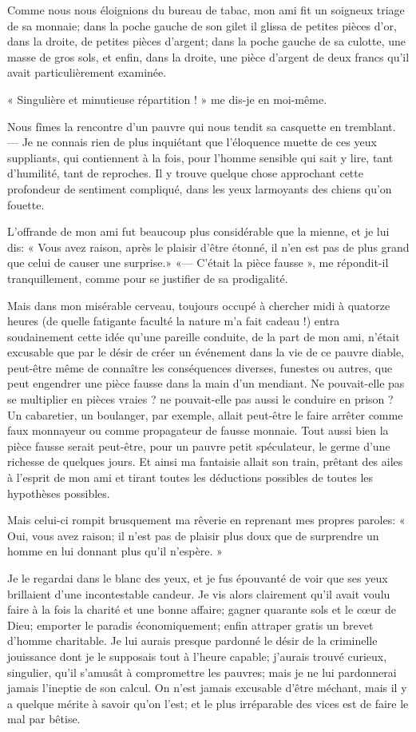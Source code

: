 Comme nous nous éloignions du bureau de tabac, mon ami fit un soigneux
triage de sa monnaie; dans la poche gauche de son gilet il glissa de
petites pièces d’or, dans la droite, de petites pièces
d’argent; dans la poche gauche de sa culotte, une
masse de gros sols, et enfin, dans la droite, une pièce
d’argent de deux francs qu’il avait
particulièrement examinée.

« Singulière et minutieuse répartition ! » me dis{}-je en moi{}-même.

Nous fîmes la rencontre d’un pauvre qui nous tendit sa
casquette en tremblant. --- Je ne connais rien de plus inquiétant que
l’éloquence muette de ces yeux suppliants, qui
contiennent à la fois, pour l’homme sensible qui sait
y lire, tant d’humilité, tant de reproches. Il y
trouve quelque chose approchant cette profondeur de sentiment
compliqué, dans les yeux larmoyants des chiens qu’on
fouette.

L’offrande de mon ami fut beaucoup plus considérable
que la mienne, et je lui dis: « Vous avez raison, après le plaisir
d’être étonné, il n’en est pas de
plus grand que celui de causer une surprise.» «---
C’était la pièce fausse », me répondit{}-il
tranquillement, comme pour se justifier de sa prodigalité.

Mais dans mon misérable cerveau, toujours occupé à chercher midi à
quatorze heures (de quelle fatigante faculté la nature
m’a fait cadeau !) entra soudainement cette idée
qu’une pareille conduite, de la part de mon ami,
n’était excusable que par le désir de créer un
événement dans la vie de ce pauvre diable, peut{}-être même de
connaître les conséquences diverses, funestes ou autres, que peut
engendrer une pièce fausse dans la main d’un mendiant.
Ne pouvait{}-elle pas se multiplier en pièces vraies ? ne
pouvait{}-elle pas aussi le conduire en prison ? Un cabaretier, un
boulanger, par exemple, allait peut{}-être le faire arrêter comme faux
monnayeur ou comme propagateur de fausse monnaie. Tout aussi bien la
pièce fausse serait peut{}-être, pour un pauvre petit spéculateur, le
germe d’une richesse de quelques jours. Et ainsi ma
fantaisie allait son train, prêtant des ailes à
l’esprit de mon ami et tirant toutes les déductions
possibles de toutes les hypothèses possibles.

Mais celui{}-ci rompit brusquement ma rêverie en reprenant mes propres
paroles: « Oui, vous avez raison; il n’est pas de
plaisir plus doux que de surprendre un homme en lui donnant plus
qu’il n’espère. »

Je le regardai dans le blanc des yeux, et je fus épouvanté de voir que
ses yeux brillaient d’une incontestable candeur. Je
vis alors clairement qu’il avait voulu faire à la fois
la charité et une bonne affaire; gagner quarante sols et le c\oe ur de
Dieu; emporter le paradis économiquement; enfin attraper gratis un
brevet d’homme charitable. Je lui aurais presque
pardonné le désir de la criminelle jouissance dont je le supposais tout
à l’heure capable; j’aurais trouvé
curieux, singulier, qu’il s’amusât à
compromettre les pauvres; mais je ne lui pardonnerai jamais
l’ineptie de son calcul. On n’est
jamais excusable d’être méchant, mais il y a quelque
mérite à savoir qu’on l’est; et le
plus irréparable des vices est de faire le mal par bêtise. 

